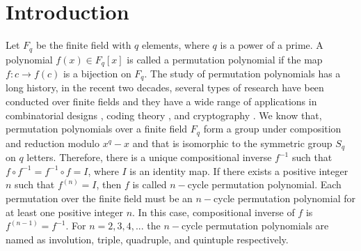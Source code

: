 \documentclass[12pt,a4paper]{article}
\begin{document}
\section{Introduction}
\label{intro}
Let $ F_{q} $ be the finite field with $ q $ elements, where $q$ is a power of a prime. A polynomial $ f(x)\in F_{q}[x] $ is called a permutation polynomial if the map $ f:c\rightarrow f(c) $ is a bijection on $ F_{q} $. The study of permutation polynomials has a long history, in the recent two decades, several types of research have been conducted over finite fields \cite{akbary2011constructing,li2018new,yuan2011permutation,yuan2014further,li2020some,tu2015two,zeng2015permutation,zieve2010classes,zieve2009some,marcos2011specific,vadiraja2017study,charpin2008class,jarali2022construction} and they have a wide range of applications in combinatorial designs \cite{ding2006family}, coding theory \cite{ding2014binary,ding2013cyclic,laigle2007permutation}, and cryptography \cite{rivest1978method,singh2009public,singh2020public,singh2011poly,khachatrian2017permutation}. We know that, permutation polynomials over a finite field $ F_{q} $ form a group under composition and reduction modulo $ x^{q}-x $ and that is isomorphic to the symmetric group $ S_{q} $ on $ q $ letters. Therefore, there is a unique compositional inverse  $ f^{-1} $ such that $ f\circ f^{-1}=f^{-1}\circ f= I $, where $ I $ is an identity map.  If there exists a positive integer $ n $ such that $ f^{(n)}=I $, then $ f $ is called $ n-$cycle permutation polynomial. Each permutation over the finite field must be an $ n-$cycle permutation polynomial for at least one positive integer $ n $. In this case, compositional inverse of $ f $ is $ f^{(n-1)}=f^{-1} $. For  $ n=2,3,4,... $ the $ n-$cycle permutation polynomials are named as involution, triple, quadruple, and quintuple respectively. 
\end{document}
